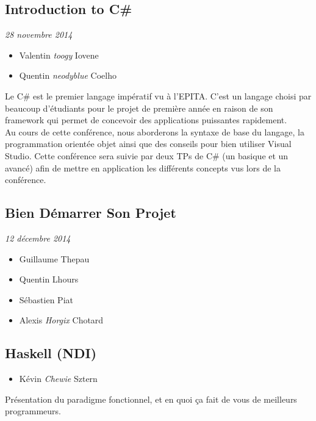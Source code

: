 \documentclass[a4paper]{article}
\begin{document}
\vspace{0.3cm}

\subsection{Introduction to C\#}
\emph{28 novembre 2014}
\begin{itemize}
    \item Valentin \emph{toogy} Iovene
    \item Quentin \emph{neodyblue} Coelho
\end{itemize}

Le C\# est le premier langage impératif vu à l'EPITA. C'est un langage choisi
par beaucoup d'étudiants pour le projet de première année en raison de son
framework qui permet de concevoir des applications puissantes rapidement.\\

Au cours de cette conférence, nous aborderons la syntaxe de base du langage, la
programmation orientée objet ainsi que des conseils pour bien utiliser Visual
Studio. Cette conférence sera suivie par deux TPs de C\# (un basique et un
avancé) afin de mettre en application les différents concepts vus lors de la
conférence.

\vspace{0.3cm}

\subsection{Bien Démarrer Son Projet}
\emph{12 décembre 2014}
\begin{itemize}
    \item Guillaume Thepau
    \item Quentin Lhours
    \item Sébastien Piat
    \item Alexis \emph{Horgix} Chotard
\end{itemize}

\vspace{0.3cm}

\subsection{Haskell (NDI)}
\begin{itemize}
    \item Kévin \emph{Chewie} Sztern
\end{itemize}

Présentation du paradigme fonctionnel, et en quoi ça fait de vous de meilleurs
programmeurs.
\end{document}
